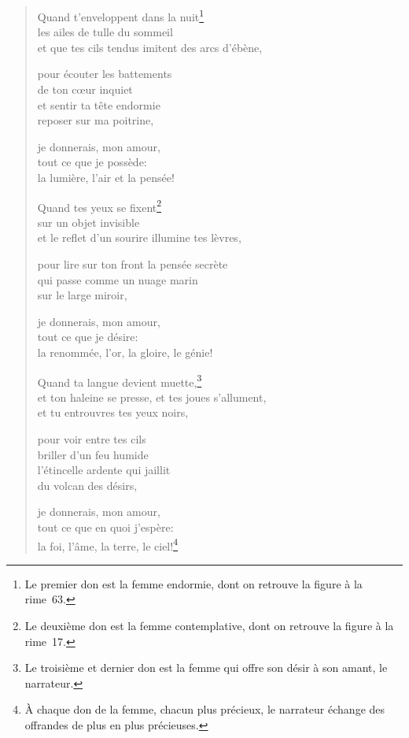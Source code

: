 \begin{verse}
  Quand t'enveloppent dans la nuit\footnote{Le premier don est la
  femme endormie, dont on retrouve la figure à la rime~63.} \\
  les ailes de tulle du sommeil \\
  et que tes cils tendus
  imitent des arcs d'ébène,

  pour écouter les battements \\
  de ton cœur inquiet \\
  et sentir ta tête endormie \\
  reposer sur ma poitrine,

  je donnerais, mon amour, \\
  tout ce que je possède: \\
  la lumière, l'air
  et la pensée!

  Quand tes yeux se fixent\footnote{Le deuxième don est la femme
  contemplative, dont on retrouve la figure à la rime~17.} \\
  sur un objet invisible \\
  et le reflet d'un sourire
  illumine tes lèvres,

  pour lire sur ton front
  la pensée secrète \\
  qui passe comme un nuage marin \\
  sur le large miroir,

  je donnerais, mon amour, \\
  tout ce que je désire: \\
  la renommée, l'or,
  la gloire, le génie!

  Quand ta langue devient muette,\footnote{Le troisième et dernier don
  est la femme qui offre son désir à son amant, le narrateur.} \\
  et ton haleine se presse,
  et tes joues s'allument, \\
  et tu entrouvres tes yeux noirs,

  pour voir entre tes cils \\
  briller d'un feu humide \\
  l'étincelle ardente qui jaillit \\
  du volcan des désirs,

  je donnerais, mon amour, \\
  tout ce que en quoi j'espère: \\
  la foi, l'âme,
  la terre, le ciel!\footnote{À chaque don de la femme, chacun plus
  précieux, le narrateur échange des offrandes de plus en plus précieuses.}
\end{verse}

